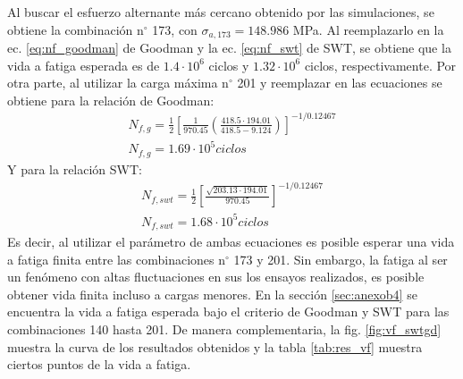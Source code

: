 Al buscar el esfuerzo alternante más cercano obtenido por las simulaciones, se obtiene la combinación n$^{\circ}$ 173, con $\sigma_{a,173} = 148.986$ MPa. Al reemplazarlo en la ec. \ref{eq:nf_goodman} de Goodman y la ec. \ref{eq:nf_swt} de SWT, se obtiene que la vida a fatiga esperada es de $1.4\cdot 10^6$ ciclos y $1.32\cdot 10^6$ ciclos, respectivamente. Por otra parte, al utilizar la carga máxima n$^{\circ}$ 201 y reemplazar en las ecuaciones se obtiene para la relación de Goodman:
\begin{gather*}
	N_{f,g} = \frac{1}{2} \left[\frac{1}{970.45} \left(\frac{418.5\cdot 194.01}{418.5 - 9.124}\right)\right]^{-1/0.12467} \\[10pt]
	N_{f,g} = 1.69 \cdot 10^{5} ciclos
\end{gather*}
Y para la relación SWT:
\begin{gather*}
	N_{f,swt} = \frac{1}{2} \left[\frac{\sqrt{203.13\cdot 194.01}}{970.45} \right]^{-1/0.12467} \\[10pt]
	N_{f,swt} = 1.68 \cdot 10^{5} ciclos
\end{gather*}
Es decir, al utilizar el parámetro de ambas ecuaciones es posible esperar una vida a fatiga finita entre las combinaciones n$^{\circ}$ 173 y 201. Sin embargo, la fatiga al ser un fenómeno con altas fluctuaciones en sus los ensayos realizados, es posible obtener vida finita incluso a cargas menores. En la sección \ref{sec:anexob4} se encuentra la vida a fatiga esperada bajo el criterio de Goodman y SWT para las combinaciones 140 hasta 201. De manera complementaria, la fig. \ref{fig:vf_swtgd} muestra la curva de los resultados obtenidos y la tabla \ref{tab:res_vf} muestra ciertos puntos de la vida a fatiga.

